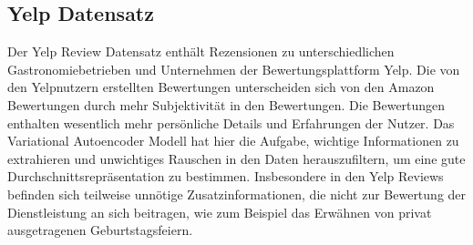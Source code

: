 



\subsection{Yelp Datensatz}
Der Yelp Review Datensatz \citep{meansum} enthält Rezensionen zu unterschiedlichen Gastronomiebetrieben und Unternehmen der Bewertungsplattform Yelp. 
Die von den Yelpnutzern erstellten Bewertungen unterscheiden sich von den Amazon Bewertungen durch mehr Subjektivität in den Bewertungen.
Die Bewertungen enthalten wesentlich mehr persönliche Details und Erfahrungen der Nutzer.
Das Variational Autoencoder Modell hat hier die Aufgabe, wichtige Informationen zu extrahieren und unwichtiges Rauschen in den Daten herauszufiltern, um eine gute Durchschnittsrepräsentation zu bestimmen.
Insbesondere in den Yelp Reviews befinden sich teilweise unnötige Zusatzinformationen, die nicht zur Bewertung der Dienstleistung an sich beitragen, wie zum Beispiel das Erwähnen von privat ausgetragenen Geburtstagsfeiern. 

